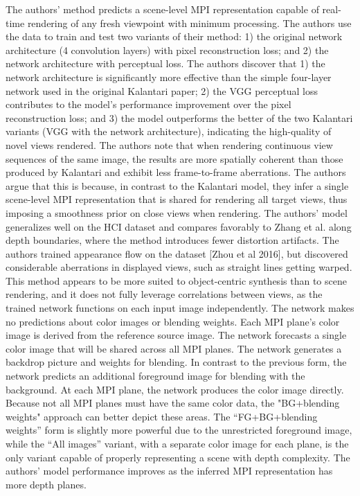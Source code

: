 The authors' method predicts a scene-level MPI representation capable of real-time rendering of any fresh viewpoint with minimum processing. The authors use the data to train and test two variants of their method: 1) the original network architecture (4 convolution layers) with pixel reconstruction loss; and 2) the network architecture with perceptual loss. The authors discover that 1) the network architecture is significantly more effective than the simple four-layer network used in the original Kalantari paper; 2) the VGG perceptual loss contributes to the model's performance improvement over the pixel reconstruction loss; and 3) the model outperforms the better of the two Kalantari variants (VGG with the network architecture), indicating the high-quality of novel views rendered. The authors note that when rendering continuous view sequences of the same image, the results are more spatially coherent than those produced by Kalantari and exhibit less frame-to-frame aberrations. The authors argue that this is because, in contrast to the Kalantari model, they infer a single scene-level MPI representation that is shared for rendering all target views, thus imposing a smoothness prior on close views when rendering. The authors' model generalizes well on the HCI dataset and compares favorably to Zhang et al. along depth boundaries, where the method introduces fewer distortion artifacts. The authors trained appearance flow on the dataset [Zhou et al 2016], but discovered considerable aberrations in displayed views, such as straight lines getting warped. This method appears to be more suited to object-centric synthesis than to scene rendering, and it does not fully leverage correlations between views, as the trained network functions on each input image independently. The network makes no predictions about color images or blending weights. Each MPI plane's color image is derived from the reference source image.
The network forecasts a single color image that will be shared across all MPI planes. The network generates a backdrop picture and weights for blending.
In contrast to the previous form, the network predicts an additional foreground image for blending with the background. At each MPI plane, the network produces the color image directly. Because not all MPI planes must have the same color data, the "BG+blending weights" approach can better depict these areas.
The “FG+BG+blending weights” form is slightly more powerful due to the unrestricted foreground image, while the “All images” variant, with a separate color image for each plane, is the only variant capable of properly representing a scene with depth complexity. The authors' model performance improves as the inferred MPI representation has more depth planes.

